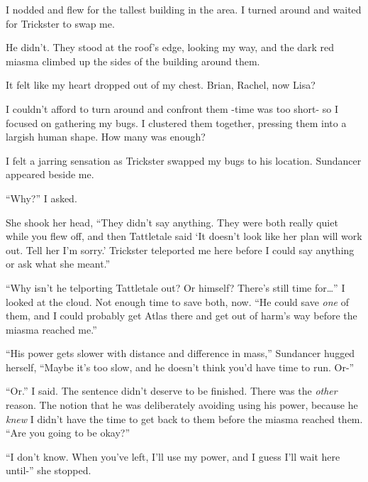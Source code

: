 I nodded and flew for the tallest building in the area.  I turned around and waited for Trickster to swap me.



He didn't.  They stood at the roof's edge, looking my way, and the dark red miasma climbed up the sides of the building around them.



It felt like my heart dropped out of my chest.  Brian, Rachel, now Lisa?



I couldn't afford to turn around and confront them -time was too short- so I focused on gathering my bugs.  I clustered them together, pressing them into a largish human shape.  How many was enough?



I felt a jarring sensation as Trickster swapped my bugs to his location.  Sundancer appeared beside me.



``Why?''  I asked.



She shook her head, ``They didn't say anything.  They were both really quiet while you flew off, and then Tattletale said `It doesn't look like her plan will work out.  Tell her I'm sorry.'  Trickster teleported me here before I could say anything or ask what she meant.''



``Why isn't he telporting Tattletale out?  Or himself?  There's still time for\ldots''  I looked at the cloud.  Not enough time to save both, now.  ``He could save \emph{one} of them, and I could probably get Atlas there and get out of harm's way before the miasma reached me.''



``His power gets slower with distance and difference in mass,''  Sundancer hugged herself, ``Maybe it's too slow, and he doesn't think you'd have time to run.  Or-''



``Or.''  I said.  The sentence didn't deserve to be finished.  There was the \emph{other} reason.  The notion that he was deliberately avoiding using his power, because he \emph{knew} I didn't have the time to get back to them before the miasma reached them.  ``Are you going to be okay?''



``I don't know.  When you've left, I'll use my power, and I guess I'll wait here until-''  she stopped.



